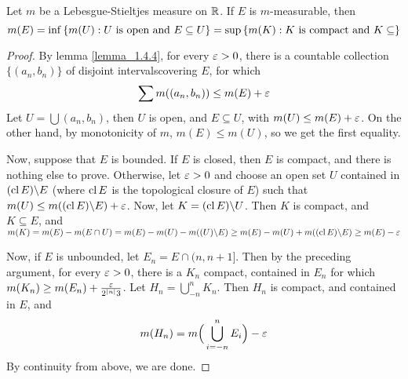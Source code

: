 \begin{theorem}\label{theorem_1.4.5}
    Let $m$ be a Lebesgue-Stieltjes measure on $\mathbb{R}$. If $E$ is  $m$-measurable,
    then
    \begin{equation}\label{equation_1.11}
        m(E)=\inf{\{m(U) : U \text{ is open and } E \subseteq U\}}  \\
        =\sup{\{m(K) : K \text{ is compact and } K \subseteq\}}
    \end{equation}
\end{theorem}
\begin{proof}
    By lemma \ref{lemma_1.4.4}, for every $\varepsilon>0$, there is a countable
    collection $\{(a_n,b_n)\}$ of disjoint intervalscovering $E$, for which
    \begin{equation*}
        \sum{m((a_n,b_n))} \leq m(E)+\varepsilon
    \end{equation*}
    Let $U=\bigcup{(a_n,b_n)}$, then $U$ is open, and $E  \subseteq U$, with
    $m(U) \leq m(E)+\varepsilon$. On the other hand, by monotonicity of $m$,  $m(E) \leq
    m(U)$, so we get the first equality.

    Now, suppose that $E$ is bounded. If  $E$ is closed, then $E$ is compact,
    and there is nothing else to prove. Otherwise, let  $\varepsilon>0$ and choose an
    open set $U$ contained in  $(\operatorname{cl}{E}) \backslash E$ (where $\operatorname{cl}{E}$ is the
    topological closure of $E$) such that $m(U) \leq m((\operatorname{cl}{E}) \backslash E)+\varepsilon$.
    Now, let $K=(\operatorname{cl}{E}) \backslash U$. Then $K$ is compact, and  $K \subseteq E$,
    and $m(K)=m(E)-m(E \cap U)=m(E)-m(U)-m((U) \backslash E) \geq
    m(E)-m(U)+m((\operatorname{cl}{E}) \backslash E) \geq m(E)-\varepsilon$

    Now, if $E$ is unbounded, let  $E_n=E \cap (n,n+1]$. Then by the preceding
    argument, for every $\varepsilon>0$, there is a  $K_n$ compact, contained in  $E_n$
    for which  $m(K_n) \geq m(E_n)+\frac{\varepsilon}{2^{|n|}3}$. Let
    $H_n=\bigcup_{-n}^n{K_n}$. Then $H_n$ is compact, and contained in $E$, and
    \begin{equation*}
        m(H_n)=m\Big{(} \bigcup_{i=-n}^n{E_i} \Big{)}-\varepsilon
    \end{equation*}
    By continuity from above, we are done.
\end{proof}

